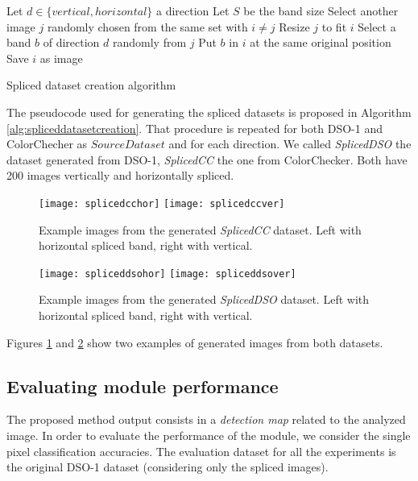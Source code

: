 \begin{algorithm}[!h]
\begin{algorithmic}[1]
\State Let $d \in \{vertical, horizontal\}$ a direction
\State Let $S$ be the band size
\State Select another image $j$ randomly chosen from the same set with $i \neq j$
\State Resize $j$ to fit $i$
\State Select a band $b$ of direction $d$ randomly from $j$
\State Put $b$ in $i$ at the same original position
\State Save $i$ as image
\EndFor
\end{algorithmic}\caption{Spliced dataset creation algorithm}\label{alg:spliceddatasetcreation}
\end{algorithm}

The pseudocode used for generating the spliced datasets is proposed in Algorithm \ref{alg:spliceddatasetcreation}. That procedure is repeated for both DSO-1 and ColorChecher as $SourceDataset$ and for each direction. We called \emph{SplicedDSO} the dataset generated from DSO-1, \emph{SplicedCC} the one from ColorChecker. Both have 200 images vertically and horizontally spliced.

\begin{figure}[!htb]
  \texttt{[image: splicedcchor]}
\endminipage\hfill
{}
  \texttt{[image: splicedccver]}
\endminipage
\caption{Example images from the generated \emph{SplicedCC} dataset. Left with horizontal spliced band, right with vertical.}\label{fig:splicedccsamples}
\end{figure}

\begin{figure}[!htb]
  \texttt{[image: spliceddsohor]}
\endminipage\hfill
{}
  \texttt{[image: spliceddsover]}
\endminipage
\caption{Example images from the generated \emph{SplicedDSO} dataset. Left with horizontal spliced band, right with vertical.}\label{fig:spliceddsosamples}
\end{figure}

Figures \ref{fig:splicedccsamples} and \ref{fig:spliceddsosamples} show two examples of generated images from both datasets. 

\subsection{Evaluating module performance}

The proposed method output consists in a\emph{ detection map} related to the analyzed image. In order to evaluate the performance of the module, we consider the single pixel classification accuracies. The evaluation dataset for all the experiments is the original DSO-1 dataset (considering only the spliced images).

